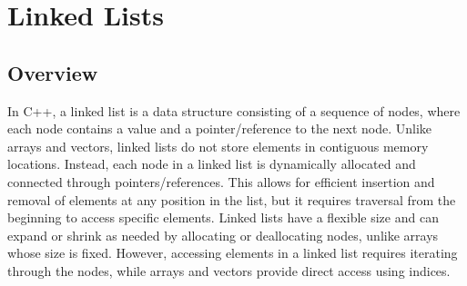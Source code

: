 \section*{Linked Lists}

\subsection*{Overview}

In C++, a linked list is a data structure consisting of a sequence of nodes, where each node contains a value and a pointer/reference to the next node. Unlike arrays and vectors, linked lists do not 
store elements in contiguous memory locations. Instead, each node in a linked list is dynamically allocated and connected through pointers/references. This allows for efficient insertion and removal 
of elements at any position in the list, but it requires traversal from the beginning to access specific elements. Linked lists have a flexible size and can expand or shrink as needed by allocating 
or deallocating nodes, unlike arrays whose size is fixed. However, accessing elements in a linked list requires iterating through the nodes, while arrays and vectors provide direct access using indices.

